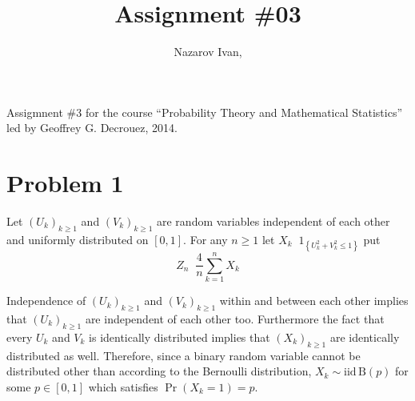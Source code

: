 \documentclass[a4paper]{article}
\title{Assignment \#03}
\author{Nazarov Ivan, \rus{101мНОД(ИССА)}}
\newcommand{\obj}[1]{\left\{ #1 \right \}}
\newcommand{\clo}[1]{\left [ #1 \right ]}
\newcommand{\brac}[1]{\left ( #1 \right )}
\newcommand{\defn}{\mathop{\overset{\Delta}{=}}\nolimits}
\begin{document}
\maketitle
\noindent Assigmnent \#3 for the course ``Probability Theory and Mathematical Statistics'' led by Geoffrey G. Decrouez, 2014.

\section{Problem 1} %
\label{sec:problem_1}

Let $\brac{U_k}_{k\geq1}$ and $\brac{V_k}_{k\geq1}$ are random variables independent of each other and uniformly distributed on $\clo{0,1}$. For any $n\geq1$ let $X_k\defn 1_{\obj{ U_k^2+V_k^2 \leq 1 }}$ put \[Z_n\defn \frac{4}{n} \sum_{k=1}^n X_k\]

Independence of $\brac{U_k}_{k\geq1}$ and $\brac{V_k}_{k\geq1}$ within and between each other implies that $\brac{U_k}_{k\geq1}$ are independent of each other too. Furthermore the fact that every $U_k$ and $V_k$ is identically distributed implies that $\brac{X_k}_{k\geq1}$ are identically distributed as well. Therefore, since a binary random variable cannot be distributed other than according to the Bernoulli distribution, $X_k\sim \text{iid}\,\text{B}\brac{p}$ for some $p\in \clo{0,1}$ which satisfies $\Pr\brac{X_k=1}=p$.
\end{document}
